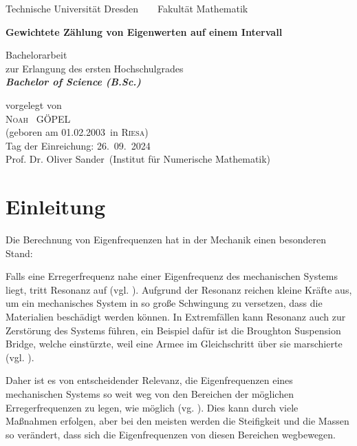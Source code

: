 \documentclass[a4paper,12pt]{report}
\newcommand{\name}{Göpel}
\newcommand{\vorname}{Noah}
\newcommand{\gebdatum}{01.02.2003}
\newcommand{\ort}{Riesa}
\newcommand{\betreuer}{Prof. Dr. Oliver Sander}
\newcommand{\institut}{Institut für Numerische Mathematik}
\newcommand{\thema}{Gewichtete Zählung von Eigenwerten auf einem Intervall}
\newcommand{\datum}{26.\ 09.\ 2024} %
\newcommand{\1}{\mathds{1}}
\theoremstyle{plain} %
\theoremstyle{definition} %
\theoremstyle{remark}
\begin{document}

\thispagestyle{empty}

\begin{center}
{\Large Technische Universit\"{a}t Dresden\  \ \textbullet\ \ Fakult\"{a}t Mathematik}

\vfil

{\bfseries\Huge\thema}

\vfil
{\LARGE
Bachelorarbeit \\[\bigskipamount]
zur Erlangung des ersten Hochschulgrades\\[\bigskipamount]
\bfseries{\itshape Bachelor of Science  \textup{(}B.Sc.\textup{)}}\\[\bigskipamount]
}

\vfil\vfil

\vfil

vorgelegt von
\\[\bigskipamount]
\textsc{\vorname\ } \MakeUppercase{\name}
\\[\bigskipamount]
(geboren am \gebdatum\ in \textsc{\ort})
\\[\bigskipamount]
Tag der Einreichung: \datum
\\[\bigskipamount]
\betreuer\ (\institut)
\end{center}

\cleardoublepage
\tableofcontents
\clearpage
\listofsymbols
\clearpage
\listoffigures
\bigskip
\listoftables

\chapter{Einleitung}
\label{sec: Einleitung}
      
      Die Berechnung von Eigenfrequenzen hat in der Mechanik einen besonderen Stand:

      Falls eine Erregerfrequenz nahe einer Eigenfrequenz des mechanischen Systems liegt, tritt Resonanz auf (vgl. \cite[S. 435]{maschinendynamikDresig}).
      Aufgrund der Resonanz reichen kleine Kräfte aus, um ein mechanisches System in so große Schwingung zu versetzen, dass die Materialien beschädigt werden können.
      In Extremfällen kann Resonanz auch zur Zerstörung des Systems führen, ein Beispiel dafür ist die Broughton Suspension Bridge, welche einstürzte, weil eine Armee im Gleichschritt über sie marschierte (vgl. \cite{brücken}).

      Daher ist es von entscheidender Relevanz, die Eigenfrequenzen eines mechanischen Systems so weit weg von den Bereichen der möglichen Erregerfrequenzen zu legen, wie möglich (vg. \cite[S. 520]{maschinendynamikDresig}).
      Dies kann durch viele Maßnahmen erfolgen, aber bei den meisten werden die Steifigkeit und die Massen so verändert, dass sich die Eigenfrequenzen von diesen Bereichen wegbewegen.
\end{document}
